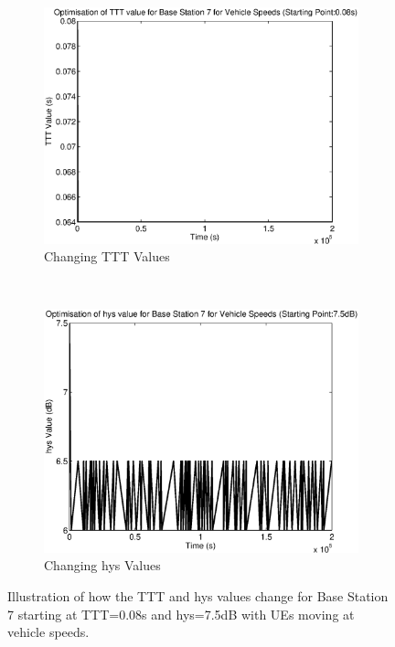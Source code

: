 \begin{figure}[H]
        \centering
        \begin{subfigure}[b]{0.49\textwidth}
                \includegraphics[width=\textwidth]{figures/graphs/vehhighhys/TTT7.eps}
                \caption{Changing TTT Values}
        \end{subfigure}%
        ~ %
        \begin{subfigure}[b]{0.49\textwidth}
                \includegraphics[width=\textwidth]{figures/graphs/vehhighhys/hys7.eps}
                \caption{Changing hys Values}
        \end{subfigure}
        \caption{Illustration of how the TTT and hys values change for Base Station 7 starting at TTT=0.08s and hys=7.5dB with UEs moving at vehicle speeds.}
\end{figure}
